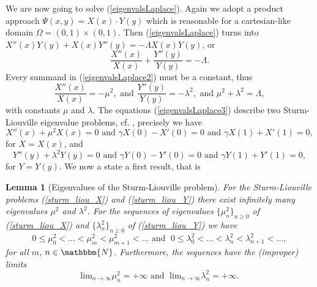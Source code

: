 \documentclass[a4paper,11pt]{article}
\theoremstyle{plain} %
\newtheorem{lemma}{Lemma}[section]
\theoremstyle{definition} %
\theoremstyle{remark} %
\theoremstyle{remark}
\begin{document}
We are now going to solve (\ref{eigenvalsLaplace}). Again we adopt a product approach $ \Psi (x,y) = X(x) \cdot Y(y) $ which is reasonable for a cartesian-like domain $ \Omega = (0,1) \times (0,1) $. Then (\ref{eigenvalsLaplace}) turns into $ X''(x) Y(y) +X(x) Y''(y) = -\Lambda X(x)Y(y) $, or
\begin{equation} \label{eigenvalsLaplace2}
\frac{X''(x)}{X(x)} + \frac{Y''(y)}{Y(y)} = - \Lambda .
\end{equation}
Every summand in (\ref{eigenvalsLaplace2}) must be a constant, thus
\begin{equation}  \label{eigenvalsLaplace3}
\frac{X''(x)}{X(x)} = -\mu^2, \text{ and } \frac{Y''(y)}{Y(y)} = -\lambda^2 ,\text{ and } \mu^2 + \lambda^2 = \Lambda ,
\end{equation}
with constants $\mu $ and $\lambda $. The equations (\ref{eigenvalsLaplace3}) describe two Sturm-Liouville eigenvalue problems, cf. \cite[p. 285]{walter2000ode}, precisely we have
\begin{equation} \label{sturm_liou_X}
X''(x) + \mu^2 X(x) = 0 \text{ and }\gamma X(0) - X'(0) = 0 \text{ and }\gamma X(1) + X'(1) = 0,
\end{equation}
for  $X = X(x) $, and
\begin{equation} \label{sturm_liou_Y}
Y''(y) + \lambda^2 Y(y) = 0\text{ and } \gamma Y(0) - Y'(0) = 0 \text{ and }\gamma Y(1) + Y'(1) = 0,
\end{equation}
for $Y = Y(y) $. We now a state a first result, that is
\begin{lemma}[Eigenvalues of the Sturm-Liouville problem] \label{sturm_liou__eig_vals}
For the Sturm-Liouville problems (\ref{sturm_liou_X}) and (\ref{sturm_liou_Y}) there exist infinitely many eigenvalues $ \mu^2 $ and $ \lambda^2 $. For the sequences of eigenvalues $ \{ \mu^2_n \}_{n \geq 0 } $ of (\ref{sturm_liou_X}) and $ \{ \lambda^2_n \}_{n \geq 0 } $ of (\ref{sturm_liou_Y}) we have 
\begin{equation} \label{eig_monotone}
0 \leq \mu^2_0 < \dots < \mu^2_m < \mu^2_{m+1} < \dots \text{ and }\; 0 \leq \lambda^2_0 < \dots < \lambda^2_n < \lambda^2_{n+1} < \dots ,
\end{equation}
for all $m$, $n \in \mathbbm{N} $. Furthermore, the sequences have the (improper) limits
\begin{equation} \label{eig_limit}
\mathrm{lim}_{n\rightarrow\infty } \mu^2_n = +\infty \text{ and }\; \mathrm{lim}_{n\rightarrow\infty } \lambda^2_n = +\infty .
\end{equation}
\end{lemma}
\end{document}
